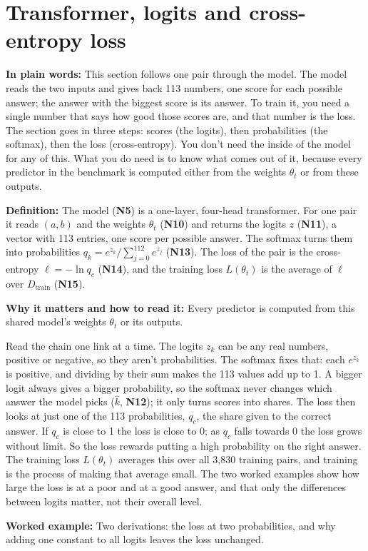 \documentclass[11pt,a4paper,oneside,openany]{report}
\newcommand{\Dtrain}{D_{\mathrm{train}}}
\newcommand{\gl}[1]{\textbf{#1}}   %
\newcommand{\fplain}{\textbf{In plain words:} }
\newcommand{\fdef}{\textbf{Definition:} }
\newcommand{\fread}{\par\textbf{Why it matters and how to read it:} }
\newcommand{\fex}{\par\textbf{Worked example:} }
\begin{document}
\section{Transformer, logits and cross-entropy loss}
\fplain This section follows one pair through the model. The model reads the two inputs and gives back 113 numbers, one score for each possible answer; the answer with the biggest score is its answer. To train it, you need a single number that says how good those scores are, and that number is the loss. The section goes in three steps: scores (the logits), then probabilities (the softmax), then the loss (cross-entropy). You don't need the inside of the model for any of this. What you do need is to know what comes out of it, because every predictor in the benchmark is computed either from the weights $\theta_t$ or from these outputs.

\fdef The model (\gl{N5}) is a one-layer, four-head transformer. For one pair it reads $(a, b)$ and the weights $\theta_t$ (\gl{N10}) and returns the logits $z$ (\gl{N11}), a vector with 113 entries, one score per possible answer. The softmax turns them into probabilities $q_k = e^{z_k} / \sum_{j=0}^{112} e^{z_j}$ (\gl{N13}). The loss of the pair is the cross-entropy $\ell = -\ln q_c$ (\gl{N14}), and the training loss $L(\theta_t)$ is the average of $\ell$ over $\Dtrain$ (\gl{N15}).
\fread Every predictor is computed from this shared model's weights $\theta_t$ or its outputs.

Read the chain one link at a time. The logits $z_k$ can be any real numbers, positive or negative, so they aren't probabilities. The softmax fixes that: each $e^{z_k}$ is positive, and dividing by their sum makes the 113 values add up to 1. A bigger logit always gives a bigger probability, so the softmax never changes which answer the model picks ($\hat k$, \gl{N12}); it only turns scores into shares. The loss then looks at just one of the 113 probabilities, $q_c$, the share given to the correct answer. If $q_c$ is close to 1 the loss is close to 0; as $q_c$ falls towards 0 the loss grows without limit. So the loss rewards putting a high probability on the right answer. The training loss $L(\theta_t)$ averages this over all 3{,}830 training pairs, and training is the process of making that average small. The two worked examples show how large the loss is at a poor and at a good answer, and that only the differences between logits matter, not their overall level.

\fex Two derivations: the loss at two probabilities, and why adding one constant to all logits leaves the loss unchanged.
\end{document}
